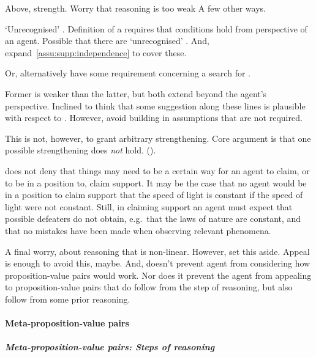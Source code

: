 \begin{note}
  Above, strength.
  Worry that reasoning is too weak
  A few other ways.

  `Unrecognised' .
  Definition of a \requ{} requires that conditions hold from perspective of an agent.
  Possible that there are `unrecognised' .
  And, expand~\autoref{assu:supp:independence} to cover these.

  Or, alternatively have some requirement concerning a search for .

  Former is weaker than the latter, but both extend beyond the agent's perspective.
  Inclined to think that some suggestion along these lines is plausible with respect to \ideaCS{}.
  However, avoid building in assumptions that are not required.

  This is not, however, to grant arbitrary strengthening.
  Core argument is that one possible strengthening does \emph{not} hold. (\ESU{}).
\end{note}

\begin{note}
  \eiS{} does not deny that things may need to be a certain way for an agent to claim, or to be in a position to, claim support.
  It may be the case that no agent would be in a position to claim support that the speed of light is constant if the speed of light were not constant.
  Still, in claiming support an agent must expect that possible defeaters do not obtain, e.g.\ that the laws of nature are constant, and that no mistakes have been made when observing relevant phenomena.
\end{note}

\begin{note}
  A final worry, about reasoning that is non-linear.
  However, set this aside.
  Appeal is enough to avoid this, maybe.
  And, doesn't prevent agent from considering how proposition-value pairs would work.
  Nor does it prevent the agent from appealing to proposition-value pairs that do follow from the step of reasoning, but also follow from some prior reasoning.
\end{note}

\hozline

\paragraph{Meta-proposition-value pairs}

\subparagraph*{Meta-proposition-value pairs: Steps of reasoning}

